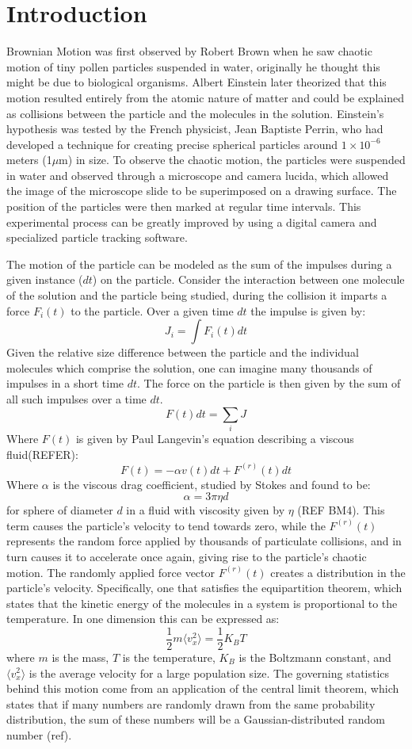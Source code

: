 \documentclass[aps,prb,twocolumn,groupedaddress,nofootinbib,floatfix]{revtex4}
\newcommand{\beq}{\begin{equation}}
\newcommand{\eeq}{\end{equation}}
\begin{document}
\section*{Introduction}
Brownian Motion was first observed by Robert Brown when he saw chaotic motion of tiny pollen particles suspended in water, originally he thought this might be due to biological organisms. Albert Einstein later theorized that this motion resulted entirely from the atomic nature of matter and could be explained as collisions between the particle and the molecules in the solution. Einstein's hypothesis was tested by the French physicist, Jean Baptiste Perrin, who had developed a technique for creating precise spherical particles around $1 \times 10^{-6}$ meters (1$\mu$m) in size. To observe the chaotic motion, the particles were suspended in water and observed through a microscope and camera lucida, which allowed the image of the microscope slide to be superimposed on a drawing surface. The position of the particles were then marked at regular time intervals. This experimental process can be greatly improved by using a digital camera and specialized particle tracking software. 

The motion of the particle can be modeled as the sum of the impulses during a given instance ($dt$) on the particle. Consider the interaction between one molecule of the solution and the particle being studied, during the collision it imparts a force $F_i(t)$ to the particle. Over a given time $dt$ the impulse is given by:
\beq
J_i=\int F_i(t)dt
\label{eq:1}
\eeq
Given the relative size difference between the particle and the individual molecules which comprise the solution, one can imagine many thousands of impulses in a short time $dt$. 
The force on the particle is then given by the sum of all such impulses over a time $dt$.
\beq
F(t)dt=\sum_{i}J
\label{eq:2}
\eeq
Where $F(t)$ is given by Paul Langevin's equation describing a viscous fluid(REFER):
\beq
F(t)=-\alpha{}v(t)dt+F^{(r)}(t)dt
\label{eq:Langevin Force}
\eeq
Where $\alpha$ is the viscous drag coefficient, studied by Stokes and found to be:
\beq
\alpha{}=3\pi{}\eta{}d
\label{eq:drag coeff}
\eeq
for sphere of diameter $d$ in a fluid with viscosity given by $\eta$ (REF BM4). This term causes the particle's velocity to tend towards zero, while the $F^{(r)}(t)$ represents the random force applied by thousands of particulate collisions, and in turn causes it to accelerate once again, giving rise to the particle's chaotic motion. The randomly applied force vector $F^{(r)}(t)$ creates a distribution in the particle's velocity. Specifically, one that satisfies the equipartition theorem, which states that the kinetic energy of the molecules in a system is proportional to the temperature.  In one dimension this can be expressed as:
\beq
\frac{1}{2}m\langle{}v_{x}^{2}\rangle=\frac{1}{2}K_{B}T
\label{eq:equipartition}
\eeq
where $m$ is the mass, $T$ is the temperature, $K_B$ is the Boltzmann constant, and $\langle{}v_{x}^{2}\rangle$ is the average velocity for a large population size.
The governing statistics behind this motion come from an application of the central limit theorem, which states that if many numbers are randomly drawn from the same probability distribution, the sum of these numbers will be a Gaussian-distributed random number (ref).
\end{document}
